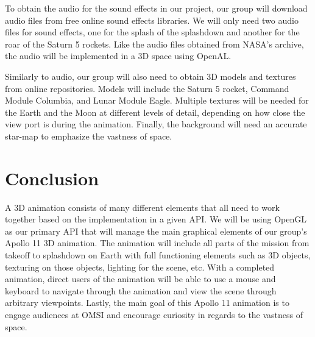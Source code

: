 \documentclass[onecolumn, draftclsnofoot,10pt, compsoc]{IEEEtran}
\begin{document}
    To obtain the audio for the sound effects in our project, our group will download audio files from free online sound effects libraries. We will only need two audio files for sound effects, one for the splash of the splashdown and another for the roar of the Saturn 5 rockets. Like the audio files obtained from NASA's archive, the audio will be implemented in a 3D space using OpenAL. 

    Similarly to audio, our group will also need to obtain 3D models and textures from online repositories. Models will include the Saturn 5 rocket, Command Module Columbia, and Lunar Module Eagle. Multiple textures will be needed for the Earth and the Moon at different levels of detail, depending on how close the view port is during the animation. Finally, the background will need an accurate star-map to emphasize the vastness of space. 
    
\section{Conclusion}
A 3D animation consists of many different elements that all need to work together based on the implementation in a given API. We will be using OpenGL as our primary API that will manage the main graphical elements of our group's Apollo 11 3D animation. The animation will include all parts of the mission from takeoff to splashdown on Earth with full functioning elements such as 3D objects, texturing on those objects, lighting for the scene, etc. With a completed animation, direct users of the animation will be able to use a mouse and keyboard to navigate through the animation and view the scene through arbitrary viewpoints. Lastly, the main goal of this Apollo 11 animation is to engage audiences at OMSI and encourage curiosity in regards to the vastness of space. 
\end{document}
